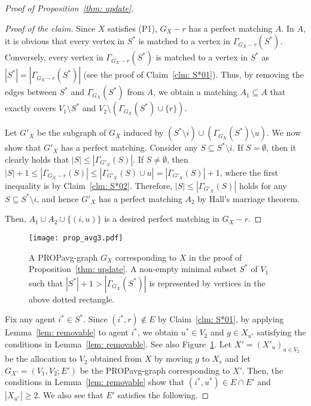 \documentclass[11pt]{article}
\newcommand{\PROPavg}{\textsf{PROPavg}\xspace}
\begin{document}
\begin{proof}[Proof of Proposition~\ref{thm: update}]
\begin{proof}[Proof of the claim]
Since $X$ satisfies (P1), $G_X - r$ has a perfect matching $A$. 
In $A$, it is obvious that every vertex in $S^*$ is matched to a vertex in $\Gamma_{G_X -r}(S^*)$.  
Conversely, every vertex in $\Gamma_{G_X -r}(S^*)$ is matched to a vertex in $S^*$ as $|S^*| = |\Gamma_{G_X -r}(S^*)|$ (see the proof of Claim~\ref{clm: S*01}). 
Thus, by removing the edges between $S^*$ and $\Gamma_{G_X}(S^*)$ from $A$, 
we obtain a matching  $A_1 \subseteq A$ that exactly covers  $V_1\setminus S^*$ and  $V_2\setminus (\Gamma_{G_X}(S^*)\cup \{r\})$.

Let $G'_X$ be the subgraph of $G_X$ induced by $(S^*\setminus i)\cup (\Gamma_{G_X}(S^*)\setminus u)$.
We now show that $G'_X$ has a perfect matching. 
Consider any $S\subseteq S^*\setminus i$.
If $S=\emptyset$, then it clearly holds that $|S|\le |\Gamma_{G'_{X}}(S)|$.
If $S\neq \emptyset$, then $|S|+1\le |\Gamma_{G_X-r} (S)| \le  |\Gamma_{G'_X} (S) \cup u| =  |\Gamma_{G'_X} (S)|+1$, where the first inequality is by Claim~\ref{clm: S*02}.  
Therefore, $|S|\le |\Gamma_{G'_{X}}(S)|$ holds for any $S\subseteq S^*\setminus i$, and hence 
$G'_X$ has a perfect matching $A_2$ by Hall's marriage theorem.

Then, $A_1\cup A_2 \cup \{(i, u)\}$ is a desired perfect matching in $G_X-r$. %
\end{proof}
\begin{figure}[tbp]
  \begin{center}
   \texttt{[image: prop\_avg3.pdf]}
 \end{center}
  \caption{A \PROPavg-graph $G_X$ corresponding to $X$ in the proof of Proposition~\ref{thm: update}. A non-empty minimal subset $S^*$ of $V_1$ such that $|S^*|+1 > |\Gamma_{G_X}(S^*)|$ is represented by vertices in the above dotted rectangle.}
  \label{fig: 3}
\end{figure}

Fix any agent $i^* \in S^*$.
Since $(i^*,r)\not\in E$ by Claim~\ref{clm: S*01}, by applying Lemma~\ref{lem: removable} to agent $i^*$, 
we obtain $u^*\in V_2$ and $g\in X_{u^*}$ satisfying the conditions in Lemma~\ref{lem: removable}.
See also Figure~\ref{fig: 3}.
Let $X'=(X'_u)_{u\in V_2}$ be the allocation to $V_2$ obtained from $X$ by moving $g$ to $X_r$ and let $G_{X'}=(V_1, V_2; E')$ be the \PROPavg-graph corresponding to $X'$.
Then, the conditions in Lemma~\ref{lem: removable} show that $(i^*, u^*)\in E \cap E'$ and $|X_{u^*}|\ge 2$. 
We also see that $E'$ satisfies the following. 


\end{proof}
\end{document}
